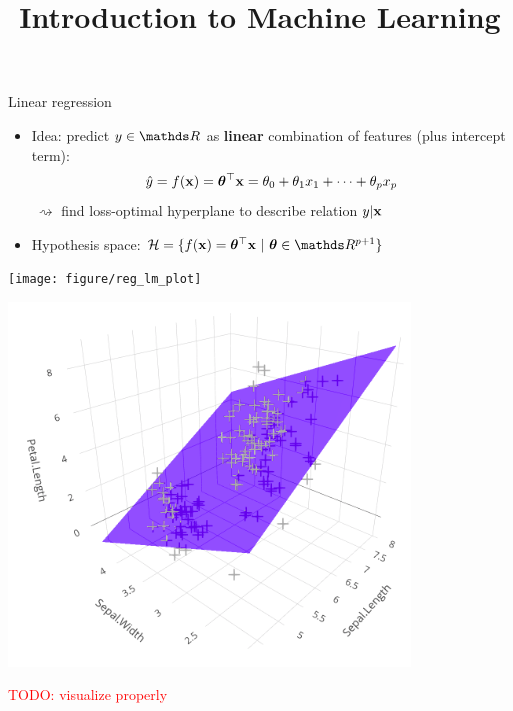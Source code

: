 \documentclass[11pt,compress,t,notes=noshow, xcolor=table]{beamer}
\title{Introduction to Machine Learning}
\institute{\href{https://compstat-lmu.github.io/lecture_i2ml/}{compstat-lmu.github.io/lecture\_i2ml}}
\date{}
\begin{document}

\begin{vbframe}{Linear regression}

\begin{itemize}
    \item Idea: predict $y \in \R$ as \textbf{linear} combination of features
    (plus intercept term):
    $$\hat{y} = f(\mathbf{x}) = \bm{\theta}^\top \mathbf{x} = \theta_0 + \theta_1 x_1 + \dots + \theta_p x_p$$
    $~\rightsquigarrow$ find loss-optimal hyperplane to describe relation 
    $y | \mathbf{x}$
    \item Hypothesis space: $\Hspace = \{\fx = \thx\ |\ \thetab \in \R^{p+1} \}$
    
\end{itemize}
\vfill
    \begin{minipage}{0.45\textwidth}
        \texttt{[image: figure/reg\_lm\_plot]} 
    \end{minipage}
    \hfill
    \begin{minipage}{0.45\textwidth}
        \includegraphics[width=0.8\textwidth]{figure/ss_regr_bivariate} 
        
        \textcolor{red}{TODO: visualize properly}
    \end{minipage}

\end{vbframe}

\end{document}
